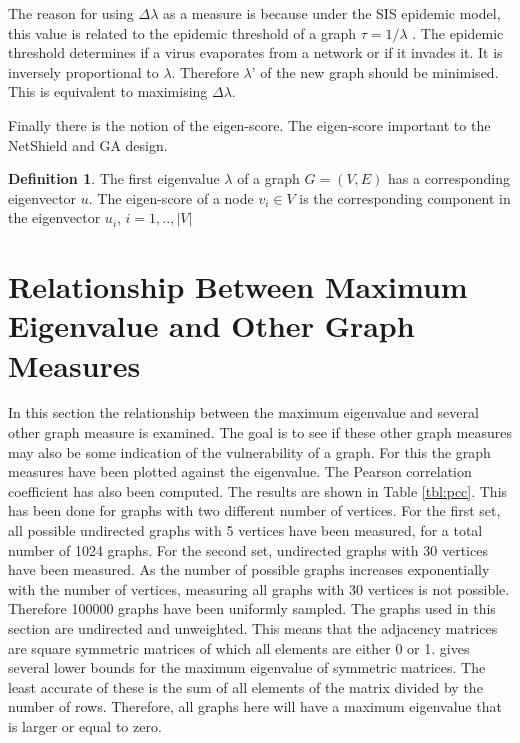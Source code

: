 \documentclass[11pt]{article}
\theoremstyle{definition}
\newtheorem{definition}{Definition}
\begin{document}
The reason for using $\Delta\lambda$ as a measure is because under the SIS epidemic model, this value is related to the epidemic threshold of a graph $\tau = 1/\lambda$ \cite{chakrabarti2008epidemic} \cite{li2013epidemic}. The epidemic threshold determines if a virus evaporates from a network or if it invades it. It is inversely proportional to $\lambda$. Therefore $\lambda$' of the new graph should be minimised. This is equivalent to maximising $\Delta\lambda$.

Finally there is the notion of the eigen-score. The eigen-score important to the NetShield and GA design.

\begin{definition}
The first eigenvalue $\lambda$ of a graph $G = (V,E)$ has a corresponding eigenvector $u$. The eigen-score of a node $v_i \in V$  is the corresponding component in the eigenvector $u_i$, $i=1,..,|V|$
\end{definition}

\cleardoublepage

\section{Relationship Between Maximum Eigenvalue and Other Graph Measures}

In this section the relationship between the maximum eigenvalue and several other graph measure is examined. The goal is to see if these other graph measures may also be some indication of the vulnerability of a graph. 
For this the graph measures have been plotted against the eigenvalue. The Pearson correlation coefficient has also been computed. The results are shown in Table \ref{tbl:pcc}. This has been done for graphs with two different number of vertices. For the first set, all possible undirected graphs with 5 vertices have been measured, for a total number of 1024 graphs. For the second set, undirected graphs with 30 vertices have been measured. As the number of possible graphs increases exponentially with the number of vertices, measuring all graphs with 30 vertices is not possible. Therefore 100000 graphs have been uniformly sampled.  
The graphs used in this section are undirected and unweighted. This means that the adjacency matrices are square symmetric matrices of which all elements are either 0 or 1. \cite{walker2008lower} gives several lower bounds for the maximum eigenvalue of symmetric matrices. The least accurate of these is the sum of all elements of the matrix divided by the number of rows. Therefore, all graphs here will have a maximum eigenvalue that is larger or equal to zero.
\end{document}
